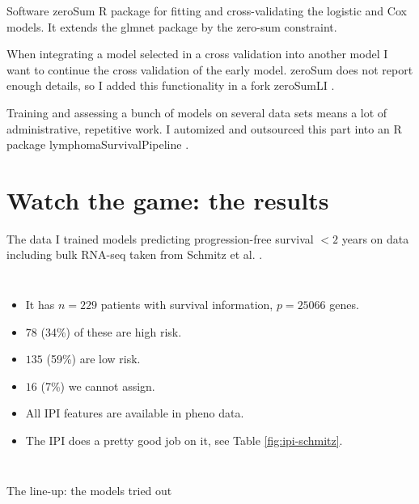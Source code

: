 \documentclass[10pt, aspectratio=169]{beamer}
\begin{document}
\begin{frame}{Software}
  \alert{zeroSum R package} \autocite{zerosumR} for fitting and cross-validating the logistic and Cox models. 
  It extends the glmnet package by the zero-sum constraint.

  \pause
  When integrating a model selected in a cross validation into another model I want to continue the cross 
  validation of the early model. zeroSum does not report enough details, so I added this functionality in 
  a \alert{fork zeroSumLI} \autocite{zerosumliR}.

  \pause
  Training and assessing a bunch of models on several data sets means a lot of administrative, repetitive 
  work. I automized and outsourced this part into an \alert{R package lymphomaSurvivalPipeline} \autocite{lspR}.
\end{frame}

\section{Watch the game: the results}

\begin{frame}{The data}
  I trained models predicting progression-free survival $< 2$ years on data including bulk RNA-seq 
  taken from Schmitz et al. \autocite{schmitz18}. 
  \begin{columns}
      \begin{itemize}
        \item It has $n = \num{229}$ patients with survival information, $p = \num{25066}$ genes.
        \item $\num{78}$ (34\%) of these are high risk.
        \item $\num{135}$ (59\%) are low risk. 
        \item $\num{16}$ (7\%) we cannot assign.
        \item All IPI features are available in pheno data.
        \item The IPI does a pretty good job on it, see Table \ref{fig:ipi-schmitz}.
      \end{itemize}
      
  \end{columns}
\end{frame}

\begin{frame}{The line-up: the models tried out}
  
\end{frame}
\end{document}
